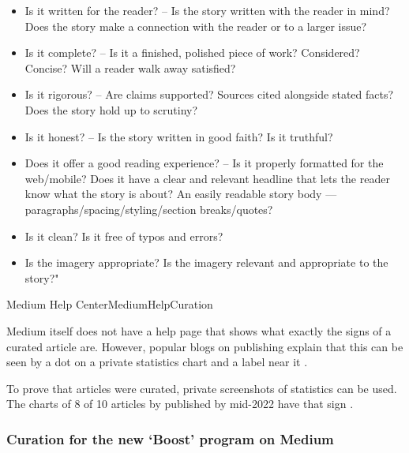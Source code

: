 {\begin{itemize}
        \item Is it written for the reader? –
        Is the story written with the reader in mind?
        Does the story make a connection with the reader or to a larger issue?

        \item Is it complete? –
        Is it a finished, polished piece of work?
        Considered?
        Concise?
        Will a reader walk away satisfied?

        \item Is it rigorous? –
        Are claims supported?
        Sources cited alongside stated facts?
        Does the story hold up to scrutiny?

        \item Is it honest? –
        Is the story written in good faith?
        Is it truthful?

        \item Does it offer a good reading experience? –
        Is it properly formatted for the web/mobile?
        Does it have a clear and relevant headline that lets the reader know what the story is about?
        An easily readable story body — paragraphs/spacing/styling/section breaks/quotes?

        \item Is it clean?
        Is it free of typos and errors?

        \item Is the imagery appropriate?
        Is the imagery relevant and appropriate to the story?"

    \end{itemize}
}{Medium Help Center}{MediumHelpCuration}

Medium itself does not have a help page that shows what exactly the signs of a curated article are.
However, popular blogs on publishing explain that this can be seen
by a dot on a private statistics chart and a label  near it
.

To prove that \mrls articles were curated, private screenshots of statistics can be used.
The charts of 8 of 10 articles by \mrl published by mid-2022 have that sign .


\subsubsection{%
    Curation for the new `Boost' program on Medium%
}

